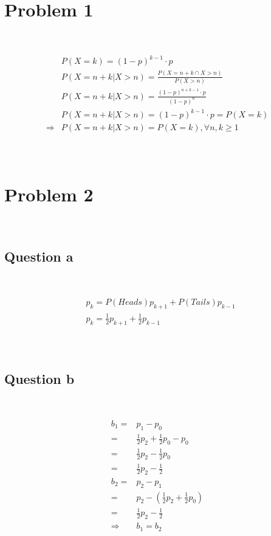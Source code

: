 \documentclass{article}
\begin{document}
\section*{Problem 1}

~

\begin{equation*}
    \begin{split}
        &P(X=k)=(1-p)^{k-1}\cdot p\\
        &P(X=n+k|X>n)=\frac{P(X=n+k\cap X>n)}{P(X>n)}\\
        &P(X=n+k|X>n)=\frac{(1-p)^{n+k-1}\cdot p}{(1-p)^n}\\
        &P(X=n+k|X>n)=(1-p)^{k-1}\cdot p=P(X=k)\\
        \Rightarrow&P(X=n+k|X>n)=P(X=k),\forall n,k\geqslant 1\\
    \end{split}
\end{equation*}

\newpage

~

\section*{Problem 2}

~

\subsection*{Question a}

~

\begin{equation*}
    \begin{split}
        &p_k=P(Heads)p_{k+1}+P(Tails)p_{k-1}\\
        &p_k=\frac{1}{2}p_{k+1}+\frac{1}{2}p_{k-1}\\
    \end{split}
\end{equation*}

~

\subsection*{Question b}

~

\begin{equation*}
    \begin{split}
        b_1=&p_1-p_0\\
        =&\frac{1}{2}p_2+\frac{1}{2}p_0-p_0\\
        =&\frac{1}{2}p_2-\frac{1}{2}p_0\\
        =&\frac{1}{2}p_2-\frac{1}{2}\\
        b_2=&p_2-p_1\\
        =&p_2-(\frac{1}{2}p_2+\frac{1}{2}p_0)\\
        =&\frac{1}{2}p_2-\frac{1}{2}\\
        \Rightarrow&b_1=b_2\\
    \end{split}
\end{equation*}
\end{document}
